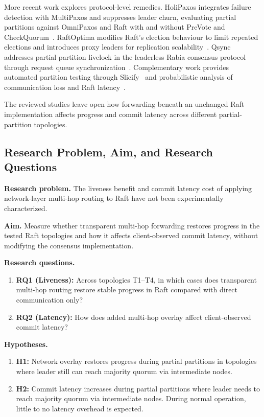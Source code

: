 \documentclass[11pt,a4paper]{article}
\begin{document}
More recent work explores protocol-level remedies.
HoliPaxos integrates failure detection with MultiPaxos and suppresses leader churn, evaluating partial partitions against OmniPaxos and Raft with and without PreVote and CheckQuorum~\cite[Secs.~3.1, 4.3]{liang2025holipaxos}.
RaftOptima modifies Raft's election behaviour to limit repeated elections and introduces proxy leaders for replication scalability~\cite[Secs.~IV--V]{kondru2024raftoptima}.
Qsync addresses partial partition livelock in the leaderless Rabia consensus protocol through request queue synchronization~\cite[Secs.~4--5]{kida2026qsync}.
Complementary work provides automated partition testing through Slicify~\cite{khaleel2024slicify} and probabilistic analysis of communication loss and Raft latency~\cite{li2026consensusnetwork}.

The reviewed studies leave open how forwarding beneath an unchanged Raft implementation affects progress and commit latency across different partial-partition topologies.
\subsection{Research Problem, Aim, and Research Questions}

\textbf{Research problem.}
The liveness benefit and commit latency cost of applying network-layer multi-hop routing to Raft have not been experimentally characterized.

\textbf{Aim.}
Measure whether transparent multi-hop forwarding restores progress in the tested Raft topologies and how it affects client-observed commit latency, without modifying the consensus implementation.

\textbf{Research questions.}
\begin{enumerate}
  \item \textbf{RQ1 (Liveness):} Across topologies T1--T4, in which cases does transparent multi-hop routing restore stable progress in Raft compared with direct communication only?
  \item \textbf{RQ2 (Latency):} How does added multi-hop overlay affect client-observed commit latency?
\end{enumerate}

\textbf{Hypotheses.}
\begin{enumerate}
  \item \textbf{H1:} Network overlay restores progress during partial partitions in topologies where leader still can reach majority quorum via intermediate nodes.
  \item \textbf{H2:} Commit latency increases during partial partitions where leader needs to reach majority quorum via intermediate nodes. During normal operation, little to no latency overhead is expected.
\end{enumerate}
\end{document}

